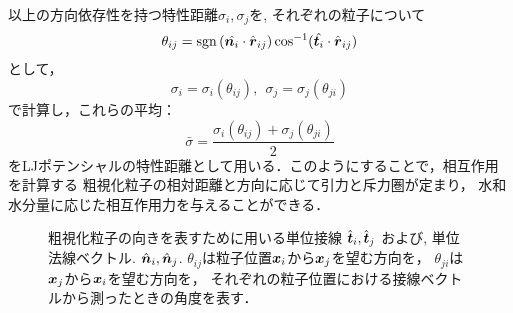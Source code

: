 以上の方向依存性を持つ特性距離$\sigma_i,\sigma_j$を,
それぞれの粒子について
\begin{equation}
	\theta_{ij}={\rm sgn} \left(\hat{\mbox{\boldmath $n$}_i}\cdot\hat{\mbox{\boldmath $r$}}_{ij} \right) 
	\cos^{-1}(\hat{\mbox{\boldmath $t$}_i}\cdot \hat{\mbox{\boldmath $r$}}_{ij})
	\label{eqn:def_thij}
\end{equation}
として，
\begin{equation}
	\sigma_i=\sigma_i(\theta_{ij}), \ \
	\sigma_j=\sigma_j(\theta_{ji})
	\label{eqn:def_thi_thj}
\end{equation}
で計算し，これらの平均：
\begin{equation}
	\bar \sigma= \frac{\sigma_i(\theta_{ij})+\sigma_j(\theta_{ji})}{2}
	\label{eqn:def_thb}
\end{equation}
をLJポテンシャルの特性距離として用いる．このようにすることで，相互作用を計算する
粗視化粒子の相対距離と方向に応じて引力と斥力圏が定まり，
水和水分量に応じた相互作用力を与えることができる．
\begin{figure}[h]
	\begin{center}
	\end{center}
	\caption{
		粗視化粒子の向きを表すために用いる単位接線
		$\hat{\mbox{\boldmath $t$}}_i,\hat{\mbox{\boldmath $t$}}_j$
		および, 単位法線ベクトル.
		$\hat{\mbox{\boldmath $n$}}_i,\hat{\mbox{\boldmath $n$}}_j$. 
		$\theta_{ij}$は粒子位置$\mbox{\boldmath $x$}_i$から$\mbox{\boldmath $x$}_j$を望む方向を，
		$\theta_{ji}$は$\mbox{\boldmath $x$}_j$から$\mbox{\boldmath $x$}_i$を望む方向を，
		それぞれの粒子位置における接線ベクトルから測ったときの角度を表す．
	} 
	\label{fig:fig9}
\end{figure}
